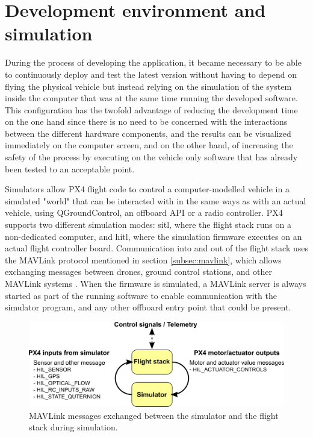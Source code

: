 \section{Development environment and simulation}
\label{sec:devenv}
During the process of developing the application, it became necessary to be able to continuously deploy and test the latest version without having to depend on flying the physical vehicle but instead relying on the simulation of the system inside the computer that was at the same time running the developed software.
This configuration has the twofold advantage of reducing the development time on the one hand since there is no need to be concerned with the interactions between the different hardware components, and the results can be visualized immediately on the computer screen, and on the other hand, of increasing the safety of the process by executing on the vehicle only software that has already been tested to an acceptable point.

Simulators allow PX4 flight code to control a computer-modelled vehicle in a simulated "world" that can be interacted with in the same ways as with an actual vehicle, using QGroundControl, an offboard API or a radio controller.
PX4 supports two different simulation modes: \acrfull{sitl}, where the flight stack runs on a non-dedicated computer, and \acrfull{hitl}, where the simulation firmware executes on an actual flight controller board.
Communication into and out of the flight stack uses the MAVLink protocol mentioned in section \ref{subsec:mavlink},
which allows exchanging messages between drones, ground control stations, and other MAVLink systems \cite{mavlink}.
When the firmware is simulated, a MAVLink server is always started as part of the running software to enable communication with the simulator program, and any other offboard entry point that could be present.


\begin{figure}
  \centering
  \includegraphics[width=\textwidth,keepaspectratio]{img/px4_simulator_messages.png}
  \caption{MAVLink messages exchanged between the simulator and the flight stack during simulation.}
  \label{fig:simulator-msgs}
\end{figure}


